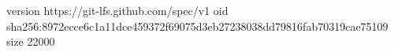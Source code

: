 version https://git-lfs.github.com/spec/v1
oid sha256:8972ecce6c1a11dce459372f69075d3eb27238038dd79816fab70319cae75109
size 22000
